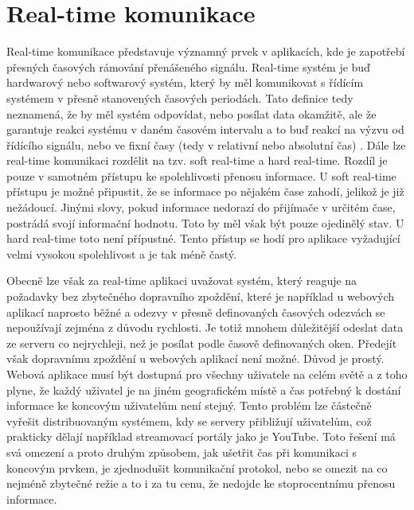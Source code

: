 \chapter{Real-time komunikace}
Real-time  komunikace představuje významný prvek v aplikacích, kde je zapotřebí přesných časových rámování přenášeného signálu. Real-time systém je buď hardwarový nebo softwarový systém, který by měl komunikovat s řídícím systémem v přesně stanovených časových periodách. Tato definice tedy neznamená, že by měl systém odpovídat, nebo posílat data okamžitě, ale že garantuje reakci systému v daném časovém intervalu a to buď reakcí na výzvu od řídícího signálu, nebo ve fixní časy (tedy v relativní nebo absolutní čas) \cite{real-time}. Dále lze real-time komunikaci rozdělit na tzv. soft real-time a hard real-time. Rozdíl je pouze v samotném přístupu ke spolehlivosti přenosu informace. U soft real-time přístupu je možné připustit, že se informace po nějakém čase zahodí, jelikož je již nežádoucí. Jinými slovy, pokud informace nedorazí do přijímače v určitém čase, postrádá svojí informační hodnotu. Toto by měl však být pouze ojedinělý stav. U hard real-time toto není přípustné. Tento přístup se hodí pro aplikace vyžadující velmi vysokou spolehlivost a je tak méně častý.

Obecně lze však za real-time aplikaci uvažovat systém, který reaguje na požadavky bez zbytečného dopravního zpoždění, které je například u webových aplikací naprosto běžné a odezvy v přesně definovaných časových odezvách se nepoužívají zejména z důvodu rychlosti. Je totiž mnohem dů\-le\-ži\-těj\-ší odeslat data ze serveru co nejrychleji, než je posílat podle časově definovaných oken. Předejít však dopravnímu zpoždění u webových aplikací není možné. Důvod je prostý. Webová aplikace musí být dostupná pro všechny uživatele na celém světě a z toho plyne, že každý uživatel je na jiném geografickém místě a čas potřebný k dostání informace ke koncovým uživatelům není stejný. Tento problém lze částečně vyřešit distribuovaným systémem, kdy se servery přibližují uživatelům, což prakticky dělají například streamovací portály jako je YouTube. Toto řešení má svá omezení a proto druhým způsobem, jak ušetřit čas při komunikaci s koncovým prvkem, je zjednodušit komunikační protokol, nebo se omezit na co nejméně zbytečné režie a to i za tu cenu, že nedojde ke stoprocentnímu přenosu informace.


